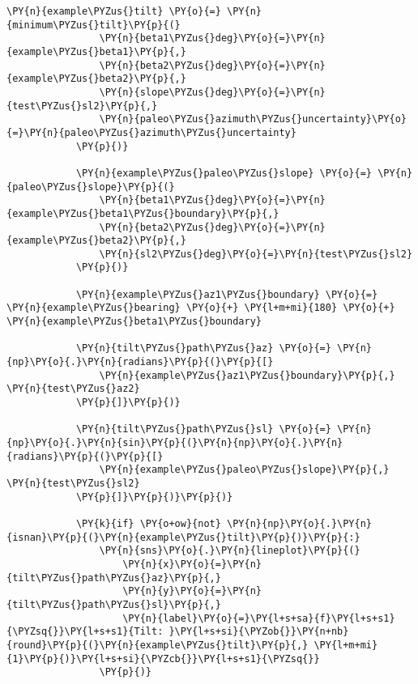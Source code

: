 \begin{tcolorbox}[breakable, size=fbox, boxrule=1pt, pad at break*=1mm,colback=cellbackground, colframe=cellborder]
\begin{Verbatim}[commandchars=\\\{\}]
            \PY{n}{example\PYZus{}tilt} \PY{o}{=} \PY{n}{minimum\PYZus{}tilt}\PY{p}{(}
                \PY{n}{beta1\PYZus{}deg}\PY{o}{=}\PY{n}{example\PYZus{}beta1}\PY{p}{,}
                \PY{n}{beta2\PYZus{}deg}\PY{o}{=}\PY{n}{example\PYZus{}beta2}\PY{p}{,}
                \PY{n}{slope\PYZus{}deg}\PY{o}{=}\PY{n}{test\PYZus{}sl2}\PY{p}{,}
                \PY{n}{paleo\PYZus{}azimuth\PYZus{}uncertainty}\PY{o}{=}\PY{n}{paleo\PYZus{}azimuth\PYZus{}uncertainty}
            \PY{p}{)}
    
            \PY{n}{example\PYZus{}paleo\PYZus{}slope} \PY{o}{=} \PY{n}{paleo\PYZus{}slope}\PY{p}{(}
                \PY{n}{beta1\PYZus{}deg}\PY{o}{=}\PY{n}{example\PYZus{}beta1\PYZus{}boundary}\PY{p}{,}
                \PY{n}{beta2\PYZus{}deg}\PY{o}{=}\PY{n}{example\PYZus{}beta2}\PY{p}{,}
                \PY{n}{sl2\PYZus{}deg}\PY{o}{=}\PY{n}{test\PYZus{}sl2}
            \PY{p}{)}
    
            \PY{n}{example\PYZus{}az1\PYZus{}boundary} \PY{o}{=} \PY{n}{example\PYZus{}bearing} \PY{o}{+} \PY{l+m+mi}{180} \PY{o}{+} \PY{n}{example\PYZus{}beta1\PYZus{}boundary}
    
            \PY{n}{tilt\PYZus{}path\PYZus{}az} \PY{o}{=} \PY{n}{np}\PY{o}{.}\PY{n}{radians}\PY{p}{(}\PY{p}{[}
                \PY{n}{example\PYZus{}az1\PYZus{}boundary}\PY{p}{,} \PY{n}{test\PYZus{}az2}
            \PY{p}{]}\PY{p}{)}
    
            \PY{n}{tilt\PYZus{}path\PYZus{}sl} \PY{o}{=} \PY{n}{np}\PY{o}{.}\PY{n}{sin}\PY{p}{(}\PY{n}{np}\PY{o}{.}\PY{n}{radians}\PY{p}{(}\PY{p}{[}
                \PY{n}{example\PYZus{}paleo\PYZus{}slope}\PY{p}{,} \PY{n}{test\PYZus{}sl2}
            \PY{p}{]}\PY{p}{)}\PY{p}{)}
    
            \PY{k}{if} \PY{o+ow}{not} \PY{n}{np}\PY{o}{.}\PY{n}{isnan}\PY{p}{(}\PY{n}{example\PYZus{}tilt}\PY{p}{)}\PY{p}{:}
                \PY{n}{sns}\PY{o}{.}\PY{n}{lineplot}\PY{p}{(}
                    \PY{n}{x}\PY{o}{=}\PY{n}{tilt\PYZus{}path\PYZus{}az}\PY{p}{,}
                    \PY{n}{y}\PY{o}{=}\PY{n}{tilt\PYZus{}path\PYZus{}sl}\PY{p}{,}
                    \PY{n}{label}\PY{o}{=}\PY{l+s+sa}{f}\PY{l+s+s1}{\PYZsq{}}\PY{l+s+s1}{Tilt: }\PY{l+s+si}{\PYZob{}}\PY{n+nb}{round}\PY{p}{(}\PY{n}{example\PYZus{}tilt}\PY{p}{,} \PY{l+m+mi}{1}\PY{p}{)}\PY{l+s+si}{\PYZcb{}}\PY{l+s+s1}{\PYZsq{}}
                \PY{p}{)}
    

\end{Verbatim}
\end{tcolorbox}
